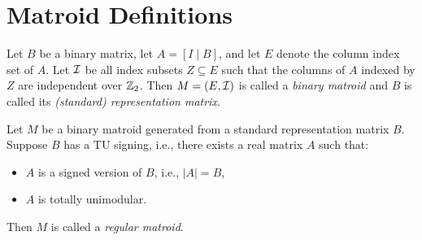 \section{Matroid Definitions}

\begin{definition}
  \label{BinaryMatroid}
  \leanok
  Let $B$ be a binary matrix, let $A = \left[ I \mid B \right]$, and let $E$ denote the column index set of $A$.
  Let $\mathcal{I}$ be all index subsets $Z \subseteq E$ such that the columns of $A$ indexed by $Z$ are independent over $\mathbb{Z}_2$.
  Then $M = \left(E, \mathcal{I}\right)$ is called a \emph{binary matroid} and $B$ is called its \emph{(standard) representation matrix}.
\end{definition}

\begin{definition}
  \label{BinaryMatroid.IsRegular}
  \leanok
  Let $M$ be a binary matroid generated from a standard representation matrix $B$. Suppose $B$ has a TU signing, i.e., there exists a real matrix $A$ such that:
  \begin{itemize}
    \item $A$ is a signed version of $B$, i.e., $\left| A \right| = B$,
    \item $A$ is totally unimodular.
  \end{itemize}
  Then $M$ is called a \emph{regular matroid}.
\end{definition}

\begin{lemma}
  \label{BinaryMatroid_toMatroid_isRegular_iff}
  \leanok %
\end{lemma}
